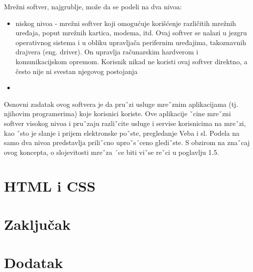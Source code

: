 \documentclass[a4paper]{article}
\begin{document}
Mrežni softver, najgrublje, može da se podeli na dva nivoa:
\begin{itemize}
\item niskog nivoa - mrežni softver koji omogućuje korišćenje različitih mrežnih uređaja, poput mrežnih kartica, modema, itd. Ovaj softver se nalazi u jezgru operativnog sistema i u obliku upravljača perifernim uređajima, takoznavnih drajvera (eng. driver). On upravlja računarskim hardverom i komunikacijskom opremom. Korisnik nikad ne koristi ovaj softver direktno, a često nije ni svestan njegovog postojanja 

\item 
\end{itemize}
Osnovni zadatak ovog softvera je da pruˇzi usluge mreˇznim aplikacijama
(tj. njihovim programerima) koje korisnici koriste. Ove aplikacije ˇcine mreˇzni
softver visokog nivoa i pruˇzaju razliˇcite usluge i servise korisnicima na mreˇzi,
kao ˇsto je slanje i prijem elektronske poˇste, pregledanje Veba i sl.
Podela na samo dva nivoa predstavlja priliˇcno uproˇs´ceno glediˇste. S obzirom
na znaˇcaj ovog koncepta, o slojevitosti mreˇza ´ce biti viˇse reˇci u poglavlju 1.5.

\newpage
\section{HTML i CSS}
\label{sec:uvod}


\newpage
\section{Zaključak}
\label{sec:zakljucak}

 


\appendix
\section{Dodatak}
\end{document}
